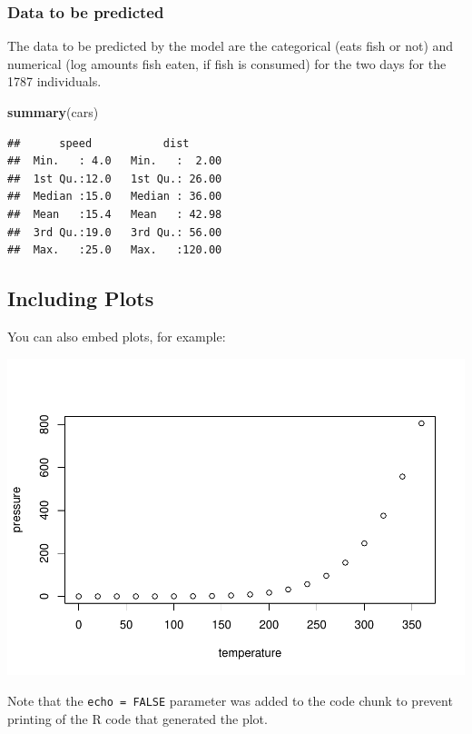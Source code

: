 \documentclass[
]{article}
\newenvironment{Shaded}{\begin{snugshade}}{\end{snugshade}}
\newcommand{\KeywordTok}[1]{\textcolor[rgb]{0.13,0.29,0.53}{\textbf{#1}}}
\newcommand{\NormalTok}[1]{#1}
\begin{document}
\hypertarget{data-to-be-predicted}{%
\subsubsection{Data to be predicted}\label{data-to-be-predicted}}

The data to be predicted by the model are the categorical (eats fish or
not) and numerical (log amounts fish eaten, if fish is consumed) for the
two days for the 1787 individuals.

\begin{Shaded}
\begin{Highlighting}[]
\KeywordTok{summary}\NormalTok{(cars)}
\end{Highlighting}
\end{Shaded}

\begin{verbatim}
##      speed           dist       
##  Min.   : 4.0   Min.   :  2.00  
##  1st Qu.:12.0   1st Qu.: 26.00  
##  Median :15.0   Median : 36.00  
##  Mean   :15.4   Mean   : 42.98  
##  3rd Qu.:19.0   3rd Qu.: 56.00  
##  Max.   :25.0   Max.   :120.00
\end{verbatim}

\hypertarget{including-plots}{%
\subsection{Including Plots}\label{including-plots}}

You can also embed plots, for example:

\includegraphics{Fish_n_stroke_2021_files/figure-latex/pressure-1.pdf}

Note that the \texttt{echo\ =\ FALSE} parameter was added to the code
chunk to prevent printing of the R code that generated the plot.
\end{document}
